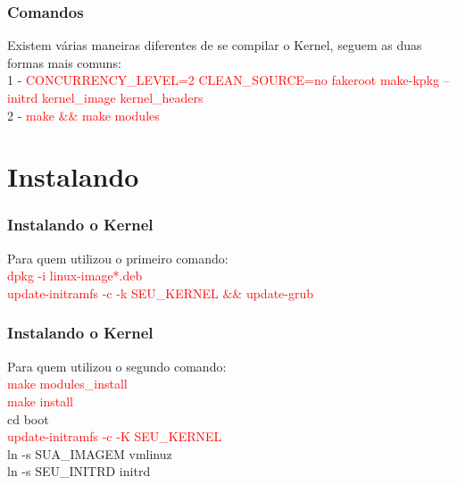 \documentclass{beamer}
\begin{document}
\begin{frame}
 \frametitle{Comandos}
 Existem várias maneiras diferentes de se compilar o Kernel, seguem as duas 
  formas mais comuns:\\
  1 - \textcolor{red}{CONCURRENCY\_LEVEL=2 CLEAN\_SOURCE=no fakeroot make-kpkg 
    --initrd kernel\_image kernel\_headers}\\

  2 - \textcolor{red}{make \&\& make modules}\\
\end{frame}

\section{Instalando}

\begin{frame}
 \frametitle{Instalando o Kernel}
 Para quem utilizou o primeiro comando:\\
 \textcolor{red}{dpkg -i linux-image*.deb}
 \\
 \textcolor{red}{update-initramfs -c -k SEU\_KERNEL \&\& update-grub}
\end{frame}

\begin{frame}
 \frametitle{Instalando o Kernel}
 Para quem utilizou o segundo comando:\\
 \textcolor{red}{make modules\_install}
 \\
 \textcolor{red}{make install}
 \\
 cd boot\/
 \\
 \textcolor{red}{update-initramfs -c -K SEU\_KERNEL}
 \\
 ln -s SUA\_IMAGEM vmlinuz
 \\
 ln -s SEU\_INITRD initrd
\end{frame}
\end{document}
